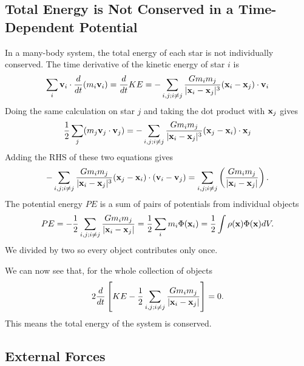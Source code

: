 \documentclass[]{article}
\begin{document}
\subsection{Total Energy is Not Conserved in a Time-Dependent Potential}

In a many-body system, the total energy of each star is not individually conserved.
The time derivative of the kinetic energy of star $i$ is
\begin{equation}
\sum_{i} \mathbf{v}_i \cdot \frac{d}{dt} (m_i \mathbf{v}_i) = \frac{d}{dt} KE = -\sum_{i,j;i\ne j} \frac{Gm_i m_j}{|\mathbf{x}_i - \mathbf{x}_j|^{3}}(\mathbf{x}_i - \mathbf{x}_j) \cdot \mathbf{v}_i
\end{equation}
\noindent
Doing the same calculation on star $j$ and taking the dot product with $\mathbf{x}_j$ gives
\begin{equation}
\frac{1}{2}\sum_{j} (m_j \mathbf{v}_j \cdot \mathbf{v}_j) = - \sum_{i,j; i\ne j}\frac{Gm_i m_j}{|\mathbf{x}_i - \mathbf{x}_j|^{3}}(\mathbf{x}_j - \mathbf{x}_i)\cdot \mathbf{x}_j
\end{equation}
\noindent
Adding the RHS of these two equations gives
\begin{equation}
- \sum_{i,j; i\ne j}\frac{Gm_i m_j}{|\mathbf{x}_i - \mathbf{x}_j|^{3}}(\mathbf{x}_j - \mathbf{x}_i)\cdot(\mathbf{v}_i - \mathbf{v}_j) = \sum_{i,j;i\ne j}\left(\frac{Gm_i m_j}{|\mathbf{x}_i - \mathbf{x}_j|}\right).
\end{equation}
The potential energy $PE$ is a sum of pairs of potentials from individual objects
\begin{equation}
PE = -\frac{1}{2} \sum_{i,j;i\ne j}\frac{Gm_i m_j}{|\mathbf{x}_i - \mathbf{x}_j|} = \frac{1}{2} \sum_i m_i \Phi(\mathbf{x}_i) = \frac{1}{2} \int \rho(\mathbf{x})\Phi(\mathbf{x})dV.
\end{equation}
\noindent
We divided by two so every object contributes only once.

We can now see that, for the whole collection of objects 
\begin{equation}
2 \frac{d}{dt} \left[ KE - \frac{1}{2} \sum_{i,j;i\ne j} \frac{G m_i m_j}{|\mathbf{x}_i - \mathbf{x}_j|}\right] = 0.
\end{equation}
\noindent
This means the total energy of the system is conserved.

\subsection{External Forces}
\end{document}
